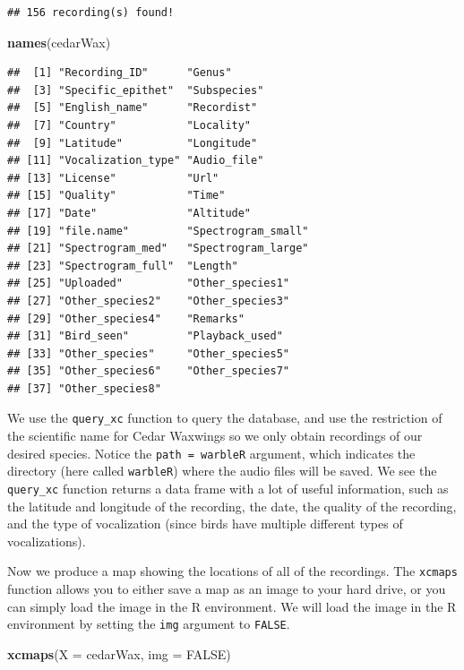 \documentclass[
]{krantz}
\newenvironment{Shaded}{\begin{snugshade}}{\end{snugshade}}
\newcommand{\DataTypeTok}[1]{\textcolor[rgb]{0.13,0.29,0.53}{#1}}
\newcommand{\KeywordTok}[1]{\textcolor[rgb]{0.13,0.29,0.53}{\textbf{#1}}}
\newcommand{\NormalTok}[1]{#1}
\newcommand{\OtherTok}[1]{\textcolor[rgb]{0.56,0.35,0.01}{#1}}
\begin{document}
\begin{verbatim}
## 156 recording(s) found!
\end{verbatim}

\begin{Shaded}
\begin{Highlighting}[]
\KeywordTok{names}\NormalTok{(cedarWax)}
\end{Highlighting}
\end{Shaded}

\begin{verbatim}
##  [1] "Recording_ID"      "Genus"            
##  [3] "Specific_epithet"  "Subspecies"       
##  [5] "English_name"      "Recordist"        
##  [7] "Country"           "Locality"         
##  [9] "Latitude"          "Longitude"        
## [11] "Vocalization_type" "Audio_file"       
## [13] "License"           "Url"              
## [15] "Quality"           "Time"             
## [17] "Date"              "Altitude"         
## [19] "file.name"         "Spectrogram_small"
## [21] "Spectrogram_med"   "Spectrogram_large"
## [23] "Spectrogram_full"  "Length"           
## [25] "Uploaded"          "Other_species1"   
## [27] "Other_species2"    "Other_species3"   
## [29] "Other_species4"    "Remarks"          
## [31] "Bird_seen"         "Playback_used"    
## [33] "Other_species"     "Other_species5"   
## [35] "Other_species6"    "Other_species7"   
## [37] "Other_species8"
\end{verbatim}

We use the \texttt{query\_xc} function to query the database, and use the restriction of the scientific name for Cedar Waxwings so we only obtain recordings of our desired species. Notice the \texttt{path\ =\ \textquotesingle{}warbleR\textquotesingle{}} argument, which indicates the directory (here called \texttt{warbleR}) where the audio files will be saved. We see the \texttt{query\_xc} function returns a data frame with a lot of useful information, such as the latitude and longitude of the recording, the date, the quality of the recording, and the type of vocalization (since birds have multiple different types of vocalizations).

Now we produce a map showing the locations of all of the recordings. The \texttt{xcmaps} function allows you to either save a map as an image to your hard drive, or you can simply load the image in the R environment. We will load the image in the R environment by setting the \texttt{img} argument to \texttt{FALSE}.

\begin{Shaded}
\begin{Highlighting}[]
\KeywordTok{xcmaps}\NormalTok{(}\DataTypeTok{X =}\NormalTok{ cedarWax, }\DataTypeTok{img =} \OtherTok{FALSE}\NormalTok{)}
\end{Highlighting}
\end{Shaded}
\end{document}
